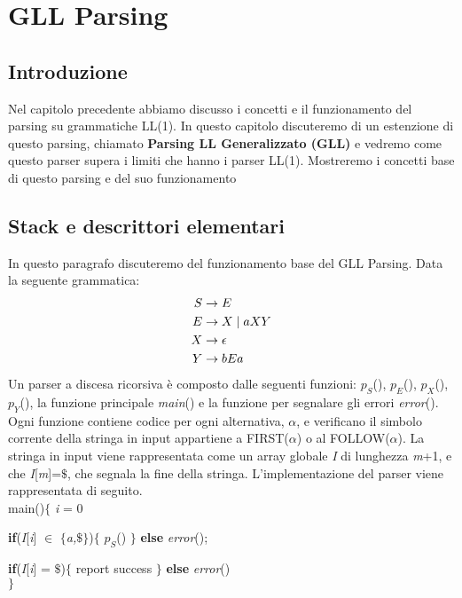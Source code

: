 \chapter{GLL Parsing}
\section{Introduzione}
Nel capitolo precedente abbiamo discusso i concetti e il funzionamento del parsing su grammatiche LL(1). In questo capitolo discuteremo di un estenzione di questo parsing, chiamato \textbf{Parsing LL Generalizzato (GLL)} e vedremo come questo parser supera i limiti che hanno i parser LL(1). Mostreremo i concetti base di questo parsing e del suo funzionamento
\section{Stack e descrittori elementari}
In questo paragrafo discuteremo del funzionamento base del GLL Parsing. Data la seguente grammatica:
\begin{align}\label{grammaticaNLL1}
	S & \to E \notag \\
	E & \to X \mid aXY \notag \\
	X & \to \epsilon \notag \\
	Y & \to bEa 
\end{align}
Un parser a discesa ricorsiva \cite{pubblicazione: scott} è composto dalle seguenti funzioni: $p_S$(), $p_E$(), $p_X$(), $p_Y$(), la funzione principale \textit{main}() e la funzione per segnalare gli errori \textit{error}(). Ogni funzione contiene codice per ogni alternativa, $\alpha$, e verificano il simbolo corrente della stringa in input appartiene a FIRST($\alpha$) o al FOLLOW($\alpha$). La stringa in input viene rappresentata come un array globale \textit{I} di lunghezza \textit{m}+1, e che \textit{I}[\textit{m}]=$\$$, che segnala la fine della stringa. L'implementazione del parser viene rappresentata di seguito.\\
main()$\{$ \textit{i} = 0 \par
\hspace{1cm}\textbf{if}(\textit{I}[\textit{i}] $\in$ $\{$\textit{a,$\$$}$\}$)$\{$ $p_S$() $\}$ \textbf{else} \textit{error}();\par
\hspace{1cm}\textbf{if}(\textit{I}[\textit{i}] = $\$$)$\{$ report success $\}$ \textbf{else} \textit{error}()\\ 
$\}$\\
\vspace{0.5cm}
